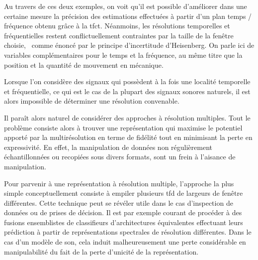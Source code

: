 Au travers de ces deux exemples, on voit qu'il est possible d'améliorer dans une certaine mesure la précision des estimations effectuées à partir d'un plan temps / fréquence obtenu grâce à la tfct. Néanmoins, les résolutions temporelles et fréquentielles restent conflictuellement contraintes par la taille de la fenêtre choisie,~\cite{slepian1983some} comme énoncé par le principe d'incertitude d'Heisenberg. On parle ici de variables complémentaires pour le temps et la fréquence, au même titre que la position et la quantité de mouvement en mécanique.

Lorsque l'on considère des signaux qui possèdent à la fois une localité temporelle et fréquentielle, ce qui est le cas de la plupart des signaux sonores naturels, il est alors impossible de déterminer une résolution convenable.

Il paraît alors naturel de considérer des approches à résolution multiples. Tout le problème consiste alors à trouver une représentation qui maximise le potentiel apporté par la multirésolution en terme de fidélité tout en minimisant la perte en expressivité. En effet, la manipulation de données non régulièrement échantillonnées ou recopiées sous divers formats, sont un frein à l'aisance de manipulation.


Pour parvenir à une représentation à résolution multiple, l'approche la plus simple conceptuellement consiste à \og empiler \fg plusieurs tfd de largeurs de fenêtre différentes. Cette technique peut se révéler utile dans le cas d'inspection de données ou de prises de décision. Il est par exemple courant de procéder à des fusions ensemblistes de classifieurs d'architectures équivalentes effectuant leurs prédiction à partir de représentations spectrales de résolution différentes. Dans le cas d'un modèle de son, cela induit malheureusement une perte considérable en manipulabilité du fait de la perte d'unicité de la représentation.

